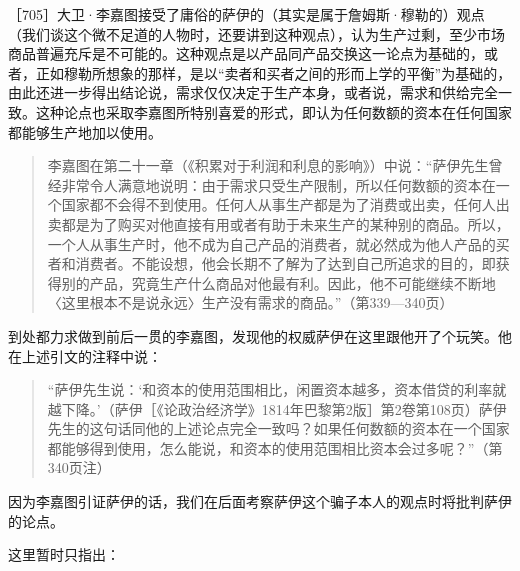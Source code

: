 ［705］大卫·李嘉图接受了庸俗的萨伊的（其实是属于詹姆斯·穆勒的）观点（我们谈这个微不足道的人物时，还要讲到这种观点），认为生产过剩，至少市场商品普遍充斥是不可能的。这种观点是以产品同产品交换这一论点为基础的，或者，正如穆勒所想象的那样，是以“卖者和买者之间的形而上学的平衡”为基础的，由此还进一步得出结论说，需求仅仅决定于生产本身，或者说，需求和供给完全一致。这种论点也采取李嘉图所特别喜爱的形式，即认为任何数额的资本在任何国家都能够生产地加以使用。

\begin{quote}{李嘉图在第二十一章（《积累对于利润和利息的影响》）中说：“萨伊先生曾经非常令人满意地说明：由于需求只受生产限制，所以任何数额的资本在一个国家都不会得不到使用。任何人从事生产都是为了消费或出卖，任何人出卖都是为了购买对他直接有用或者有助于未来生产的某种别的商品。所以，一个人从事生产时，他不成为自己产品的消费者，就必然成为他人产品的买者和消费者。不能设想，他会长期不了解为了达到自己所追求的目的，即获得别的产品，究竟生产什么商品对他最有利。因此，他不可能继续不断地〈这里根本不是说永远〉生产没有需求的商品。”（第339—340页）}\end{quote}

到处都力求做到前后一贯的李嘉图，发现他的权威萨伊在这里跟他开了个玩笑。他在上述引文的注释中说：

\begin{quote}{“萨伊先生说：‘和资本的使用范围相比，闲置资本越多，资本借贷的利率就越下降。’（萨伊［《论政治经济学》1814年巴黎第2版］第2卷第108页）萨伊先生的这句话同他的上述论点完全一致吗？如果任何数额的资本在一个国家都能够得到使用，怎么能说，和资本的使用范围相比资本会过多呢？”（第340页注）}\end{quote}

因为李嘉图引证萨伊的话，我们在后面考察萨伊这个骗子本人的观点时将批判萨伊的论点。

这里暂时只指出：

